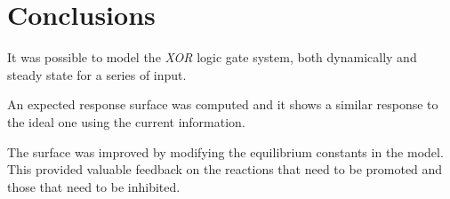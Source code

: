 \documentclass[10pt]{article}
\begin{document}
\section{Conclusions}\par
It was possible to model the \textit{XOR} logic gate system, both dynamically and steady state for a series of input.\par 
An expected response surface was computed and it shows a similar response to the ideal one using the current information.
\par 
The surface was improved by modifying the equilibrium constants in the model. This provided valuable feedback on the reactions that need to be promoted and those that need to be inhibited. 
\end{document}

